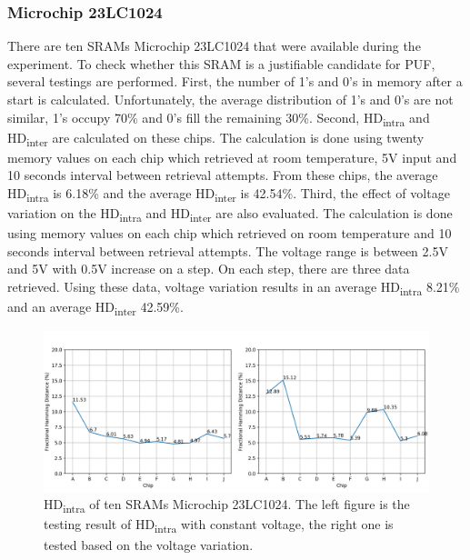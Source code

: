 \subsubsection{Microchip 23LC1024}
There are ten SRAMs Microchip 23LC1024 that were available during the experiment. To check whether this SRAM is a justifiable candidate for PUF, several testings are performed.
First, the number of 1's and 0's in memory after a start is calculated. Unfortunately, the average distribution of 1's and 0's are not similar, 1's occupy 70\% and 0's fill the remaining 30\%.
Second, HD\textsubscript{intra} and HD\textsubscript{inter} are calculated on these chips. The calculation is done using twenty memory values on each chip which retrieved at room temperature, 5V input and 10 seconds interval between retrieval attempts. From these chips, the average HD\textsubscript{intra} is 6.18\% and the average HD\textsubscript{inter} is 42.54\%.
Third, the effect of voltage variation on the HD\textsubscript{intra} and HD\textsubscript{inter} are also evaluated. The calculation is done using memory values on each chip which retrieved on room temperature and 10 seconds interval between retrieval attempts. The voltage range is between 2.5V and 5V with 0.5V increase on a step. On each step, there are three data retrieved. Using these data, voltage variation results in an average HD\textsubscript{intra} 8.21\% and an average HD\textsubscript{inter} 42.59\%.

\begin{figure}[tph!]
    \centerline{\includegraphics[width={\textwidth}]{images/23lc1024_hd_intra}}
    \caption{HD\textsubscript{intra} of ten SRAMs Microchip 23LC1024. The left figure is the testing result of HD\textsubscript{intra} with constant voltage, the right one is tested based on the voltage variation.}
    \label{fig:23lc1024_hd_intra}
\end{figure}


